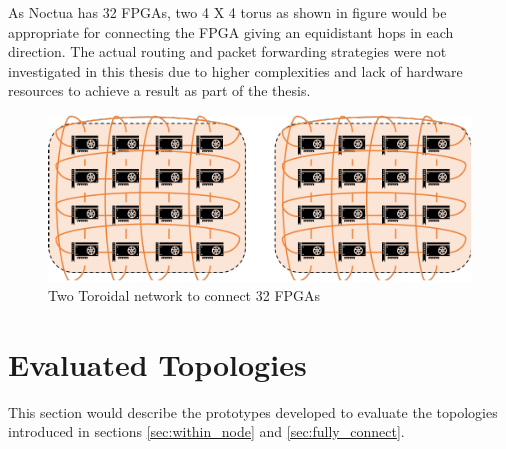 As Noctua has 32 FPGAs, two 4 X 4 torus as shown in figure  would be appropriate for connecting the FPGA giving an equidistant
hops in each direction. The actual routing and packet forwarding strategies
were not investigated in this thesis due to higher complexities
and lack of hardware resources to achieve a result as part of the thesis.

\begin{figure}[h]%
    \centering
    \includegraphics[width=1.0\textwidth]{images/torus}
    \caption{Two Toroidal network to connect 32 FPGAs}
    \label{fig:toroidal}
\end{figure}

\section{Evaluated Topologies}

This section would describe the prototypes developed to evaluate the topologies
introduced in sections \ref{sec:within_node} and \ref{sec:fully_connect}.

